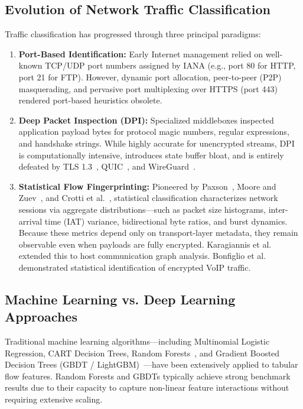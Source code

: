 \documentclass[conference]{IEEEtran}
\begin{document}
\subsection{Evolution of Network Traffic Classification}
Traffic classification has progressed through three principal paradigms:
\begin{enumerate}
    \item \textbf{Port-Based Identification:} Early Internet management relied on well-known TCP/UDP port numbers assigned by IANA (e.g., port 80 for HTTP, port 21 for FTP). However, dynamic port allocation, peer-to-peer (P2P) masquerading, and pervasive port multiplexing over HTTPS (port 443) rendered port-based heuristics obsolete.
    \item \textbf{Deep Packet Inspection (DPI):} Specialized middleboxes inspected application payload bytes for protocol magic numbers, regular expressions, and handshake strings. While highly accurate for unencrypted streams, DPI is computationally intensive, introduces state buffer bloat, and is entirely defeated by TLS 1.3~\cite{rescorla2018tls}, QUIC~\cite{iyengar2021quic}, and WireGuard~\cite{donenfeld2017wireguard}.
    \item \textbf{Statistical Flow Fingerprinting:} Pioneered by Paxson~\cite{paxson1994empirically}, Moore and Zuev~\cite{moore2005internet}, and Crotti et al.~\cite{crotti2007traffic}, statistical classification characterizes network sessions via aggregate distributions---such as packet size histograms, inter-arrival time (IAT) variance, bidirectional byte ratios, and burst dynamics. Because these metrics depend only on transport-layer metadata, they remain observable even when payloads are fully encrypted. Karagiannis et al.~\cite{karagiannis2005blinc} extended this to host communication graph analysis. Bonfiglio et al.~\cite{bonfiglio2007revealing} demonstrated statistical identification of encrypted VoIP traffic.
\end{enumerate}

\subsection{Machine Learning vs. Deep Learning Approaches}
Traditional machine learning algorithms---including Multinomial Logistic Regression, CART Decision Trees, Random Forests~\cite{breiman2001random}, and Gradient Boosted Decision Trees (GBDT / LightGBM)~\cite{ke2017lightgbm}---have been extensively applied to tabular flow features. Random Forests and GBDTs typically achieve strong benchmark results due to their capacity to capture non-linear feature interactions without requiring extensive scaling. 
\end{document}
